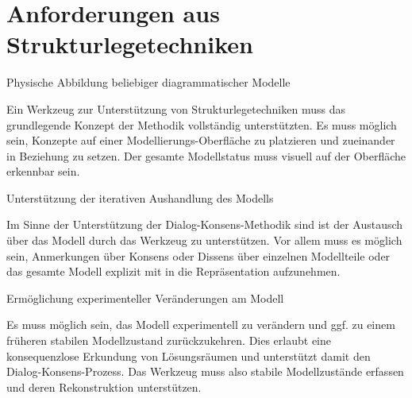 \section{Anforderungen aus Strukturlegetechniken} %
\label{sec:anforderungen_aus_strukturlegetechniken}

\begin{anf}
	\label{anf:physische_abbildung_legen_beliebiger_diagrammatischer_modelle}
	Physische Abbildung beliebiger diagrammatischer Modelle
\end{anf}


Ein Werkzeug zur Unterstützung von Strukturlegetechniken muss das grundlegende Konzept der Methodik vollständig unterstützten. Es muss möglich sein, Konzepte auf einer Modellierungs-Oberfläche zu platzieren und zueinander in Beziehung zu setzen. Der gesamte Modellstatus muss visuell auf der Oberfläche erkennbar sein.


\begin{anf}
	\label{anf:unterstützung_der_iterativen_aushandlung_des_modells}
	Unterstützung der iterativen Aushandlung des Modells
\end{anf}


Im Sinne der Unterstützung der Dialog-Konsens-Methodik sind ist der Austausch über das Modell durch das Werkzeug zu unterstützen. Vor allem muss es möglich sein, Anmerkungen über Konsens oder Dissens über einzelnen Modellteile oder das gesamte Modell explizit mit in die Repräsentation aufzunehmen. 


\begin{anf}
	\label{anf:ermöglichung_experimenteller_veränderungen_am_modell}
	Ermöglichung experimenteller Veränderungen am Modell
\end{anf}

Es muss möglich sein, das Modell experimentell zu verändern und ggf. zu einem früheren stabilen Modellzustand zurückzukehren. Dies erlaubt eine konsequenzlose Erkundung von Lösungsräumen und unterstützt damit den Dialog-Konsens-Prozess. Das Werkzeug muss also stabile Modellzustände erfassen und deren Rekonstruktion unterstützen.



